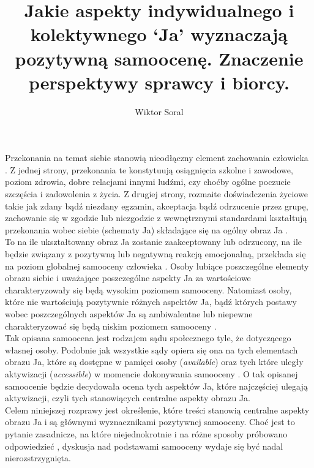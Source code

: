 \documentclass[man]{apa6}
\title{Jakie aspekty indywidualnego i kolektywnego `Ja' wyznaczają
       pozytywną samoocenę. Znaczenie perspektywy sprawcy i biorcy.}
\author{Wiktor Soral}
\affiliation{Uniwersytet Warszawski}
\begin{document}
\maketitle

Przekonania na temat siebie stanowią nieodłączny element zachowania człowieka \parencite[np.,][]{bandura1991social, deci2000and, rosenberg1965society, tesser1988toward}. Z jednej strony, przekonania te konstytuują osiągnięcia szkolne i zawodowe, poziom zdrowia, dobre relacjami innymi ludźmi, czy choćby ogólne poczucie szczęścia i zadowolenia z życia. Z drugiej strony, rozmaite doświadczenia życiowe takie jak zdany bądź niezdany egzamin, akceptacja bądź odrzucenie przez grupę, zachowanie się w zgodzie lub niezgodzie z wewnętrznymi standardami kształtują przekonania wobec siebie (schematy Ja) składające się na ogólny obraz Ja \parencite{markus1977self}. \\

To na ile ukształtowany obraz Ja zostanie zaakceptowany lub odrzucony, na ile będzie związany z pozytywną lub negatywną reakcją emocjonalną, przekłada się na poziom globalnej samooceny człowieka \parencite{brown1993self, rosenberg1965society}. Osoby lubiące poszczególne elementy obrazu siebie i uważające poszczególne aspekty Ja za wartościowe charakteryzowały się będą wysokim poziomem samooceny. Natomiast osoby, które nie wartościują pozytywnie różnych aspektów Ja, bądź których postawy wobec poszczególnych aspektów Ja są ambiwalentne lub niepewne charakteryzować się będą niskim poziomem samooceny \parencite{baumeister1989self}.\\

Tak opisana samoocena jest rodzajem sądu społecznego tyle, że dotyczącego własnej osoby. Podobnie jak wszystkie sądy opiera się ona na tych elementach obrazu Ja, które są dostępne w pamięci osoby (\emph{available}) oraz tych które uległy aktywizacji (\emph{accessible}) w momencie dokonywania samooceny \parencite[zob. np., ][]{higgins1996knowledge}. O tak opisanej samoocenie będzie decydowała ocena tych aspektów Ja, które najczęściej ulegają aktywizacji, czyli tych stanowiących centralne aspekty obrazu Ja.\\

Celem niniejszej rozprawy jest określenie, które treści stanowią centralne aspekty obrazu Ja i są głównymi wyznacznikami pozytywnej samooceny. Choć jest to pytanie zasadnicze, na które niejednokrotnie i na różne sposoby próbowano odpowiedzieć \parencite[np.,][]{brambilla2014importance, gebauer2013agency, wojciszke2011self}, dyskusja nad podstawami samooceny wydaje się być nadal nierozstrzygnięta.\\
\end{document}
